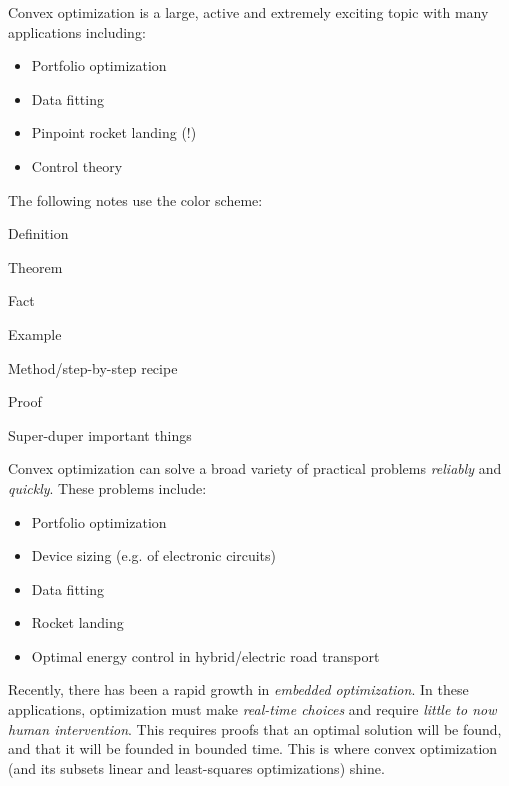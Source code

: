 
Convex optimization is a large, active and extremely exciting topic with many applications including:

\begin{itemize}
\item Portfolio optimization
\item Data fitting
\item Pinpoint rocket landing (!)
\item Control theory
\end{itemize}


The following notes use the color scheme:

\begin{Definition}
Definition
\end{Definition}
\begin{Theorem}
Theorem
\end{Theorem}
\begin{Fact}
Fact
\end{Fact}
\begin{Example}
Example
\end{Example}
\begin{Method}
Method/step-by-step recipe
\end{Method}
\begin{Proof}
Proof
\end{Proof}
\begin{VeryImportantStuff}
Super-duper important things
\end{VeryImportantStuff}


Convex optimization can solve a broad variety of practical problems \textit{reliably} and \textit{quickly}. These problems include:

\begin{itemize}
\item Portfolio optimization
\item Device sizing (e.g. of electronic circuits)
\item Data fitting
\item Rocket landing
\item Optimal energy control in hybrid/electric road transport
\end{itemize}

Recently, there has been a rapid growth in \textit{embedded optimization}. In these applications, optimization must make \textit{real-time choices} and require \textit{little to now human intervention}. This requires proofs that an optimal solution will be found, and that it will be founded in bounded time. This is where convex optimization (and its subsets linear and least-squares optimizations) shine.
